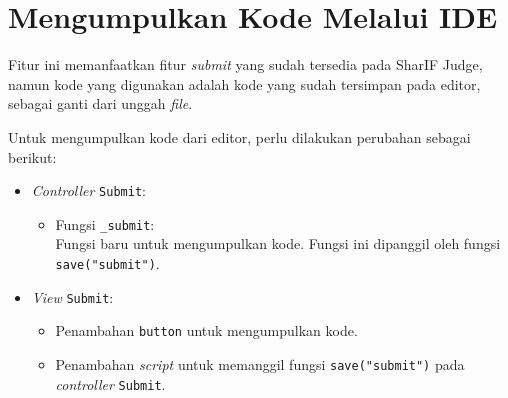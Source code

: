 \section{Mengumpulkan Kode Melalui IDE}
\label{sec:4:kumpul}

Fitur ini memanfaatkan fitur \textit{submit} yang sudah tersedia pada SharIF Judge, namun kode yang digunakan adalah kode yang sudah tersimpan pada editor, sebagai ganti dari unggah \textit{file}. 

Untuk mengumpulkan kode dari editor, perlu dilakukan perubahan sebagai berikut:
\begin{itemize}
	\item \textit{Controller} \verb|Submit|:
    \begin{itemize}
		\item Fungsi \verb|_submit|: \\ Fungsi baru untuk mengumpulkan kode. Fungsi ini dipanggil oleh fungsi \verb|save("submit")|.
    \end{itemize}
    \item \textit{View} \verb|Submit|:
    \begin{itemize}
        \item Penambahan \verb|button| untuk mengumpulkan kode.
        \item Penambahan \textit{script} untuk memanggil fungsi \verb|save("submit")| pada \textit{controller} \verb|Submit|. 
    \end{itemize}
\end{itemize}
